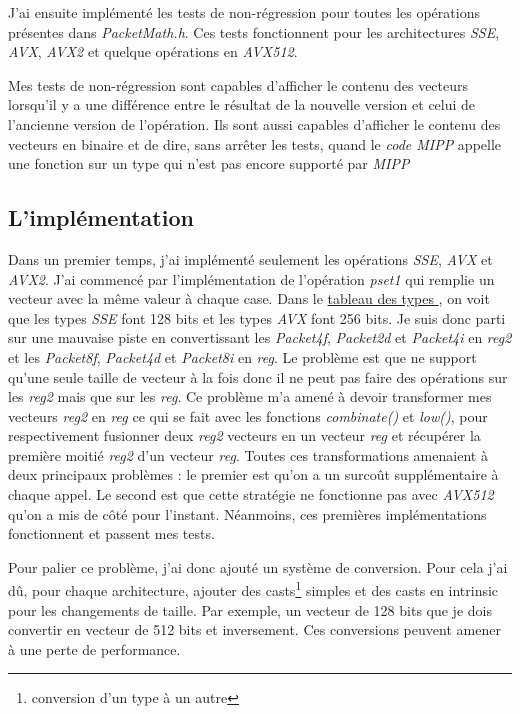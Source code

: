 J'ai ensuite implémenté les tests de non-régression pour toutes les opérations présentes
dans \emph{PacketMath.h}. Ces tests fonctionnent pour les architectures \emph{SSE}, \emph{AVX},
\emph{AVX2} et quelque opérations en \emph{AVX512}.

Mes tests de non-régression sont capables d'afficher le contenu des vecteurs lorsqu'il y a
une différence entre le résultat de la nouvelle version et celui de l'ancienne version
de l'opération.
Ils sont aussi capables d'afficher le contenu des vecteurs en binaire et de dire, sans
arrêter les tests, quand le \emph{code MIPP} appelle une fonction \MIPP sur un type qui
n'est pas encore supporté par \emph{MIPP}

\subsection{L'implémentation}

Dans un premier temps, j'ai implémenté seulement les opérations \emph{SSE}, \emph{AVX} et
\emph{AVX2}.
J'ai commencé par l'implémentation de l'opération \emph{pset1} qui remplie un vecteur avec
la même valeur à chaque case. Dans le \hyperref[eigenTypesTable]{tableau des types \Eigen},
on voit que les types \emph{SSE} font 128 bits et les types \emph{AVX} font 256 bits. Je
suis donc parti sur une mauvaise piste en convertissant les \emph{Packet4f},
\emph{Packet2d} et \emph{Packet4i} en \emph{reg2} et les \emph{Packet8f}, \emph{Packet4d}
et \emph{Packet8i} en \emph{reg}. Le problème est que \MIPP ne support qu'une seule taille
de vecteur à la fois donc il ne peut pas faire des opérations sur les \emph{reg2} mais
que sur les \emph{reg}. Ce problème m'a amené à devoir transformer mes vecteurs \emph{reg2}
en \emph{reg} ce qui se fait avec les fonctions \emph{combinate()} et \emph{low()}, pour
respectivement fusionner deux \emph{reg2} vecteurs en un vecteur \emph{reg} et récupérer
la première moitié \emph{reg2} d'un vecteur \emph{reg}. Toutes ces transformations amenaient
à deux principaux problèmes :  le premier est qu'on a un surcoût supplémentaire à chaque
appel. Le second est que cette stratégie ne fonctionne pas avec \emph{AVX512} qu'on a
mis de côté pour l'instant. Néanmoins, ces premières implémentations fonctionnent et passent
mes tests.

Pour palier ce problème, j'ai donc ajouté un système de conversion. Pour cela j'ai dû, pour
chaque architecture, ajouter des casts\footnote{conversion d'un type à un autre} simples et
des casts en intrinsic pour les changements de taille. Par exemple, un vecteur de 128 bits
que je dois convertir en vecteur de 512 bits et inversement.
Ces conversions peuvent amener à une perte de performance.

